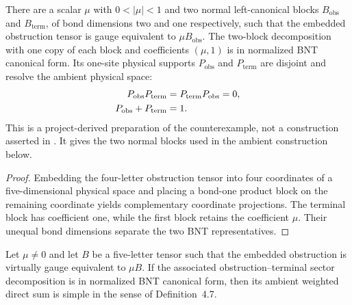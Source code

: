 \begin{lemma}
    \label{thm:mpdo_neighboring_trace_obstruction_prepared_two_block_bnt}
    \leanok
    There are a scalar $\mu$ with $0<|\mu|<1$ and two normal
    left-canonical blocks $B_{\mathrm{obs}}$ and $B_{\mathrm{term}}$, of bond
    dimensions two and one respectively, such that the embedded obstruction
    tensor is gauge equivalent to $\mu B_{\mathrm{obs}}$.
    The two-block decomposition with one copy of each block and coefficients
    $(\mu,1)$ is in normalized BNT canonical form. Its one-site physical
    supports $P_{\mathrm{obs}}$ and $P_{\mathrm{term}}$ are disjoint and
    resolve the ambient physical space:
    \begin{align}
        P_{\mathrm{obs}}P_{\mathrm{term}}
                                           & =P_{\mathrm{term}}P_{\mathrm{obs}}=0,
        \notag                                                                     \\
        P_{\mathrm{obs}}+P_{\mathrm{term}} & =1.
        \notag
    \end{align}
    This is a project-derived preparation of the counterexample, not a
    construction asserted in \cite{Cirac2016MPDO_arXiv}. It gives the two
    normal blocks used in the ambient construction below.
\end{lemma}

\begin{proof}\leanok
    Embedding the four-letter obstruction tensor into four coordinates of a
    five-dimensional physical space and placing a bond-one product block on the
    remaining coordinate yields complementary coordinate projections. The
    terminal block has coefficient one, while the first block retains the
    coefficient $\mu$. Their unequal bond dimensions separate the two BNT
    representatives.
\end{proof}

\begin{lemma}
    \label{lem:mpdo_neighboring_trace_obstruction_ambient_simple}
    \leanok
    Let $\mu\ne0$ and let $B$ be a five-letter tensor such that the embedded
    obstruction is virtually gauge equivalent to $\mu B$. If the associated
    obstruction--terminal sector decomposition is in normalized BNT canonical
    form, then its ambient weighted direct sum is simple in the sense of
    Definition~4.7.
\end{lemma}

